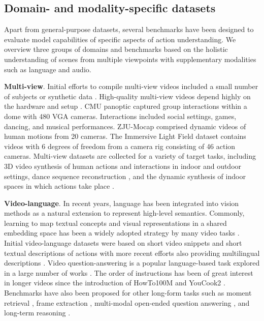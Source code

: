\subsection{Domain- and modality-specific datasets}
\label{sec:datasets::specific}

Apart from general-purpose datasets, several benchmarks have been designed to evaluate model capabilities of specific aspects of action understanding. We overview three groups of domains and benchmarks based on the holistic understanding of scenes from multiple viewpoints with supplementary modalities such as language and audio.

\noindent
\textbf{Multi-view}. Initial efforts to compile multi-view videos included a small number of subjects \citep{sigal2010humaneva} or synthetic data \citep{ionescu2013human3}. High-quality multi-view videos depend highly on the hardware and setup \citep{wang2023learning}. CMU panoptic \citep{joo2017panoptic} captured group interactions within a dome with 480 VGA cameras. Interactions included social settings, games, dancing, and musical performances. ZJU-Mocap \citep{peng2021neural} comprised dynamic videos of human motions from 20 cameras. The Immersive Light Field dataset \citep{broxton2020immersive} contains videos with 6 degrees of freedom from a camera rig consisting of 46 action cameras. Multi-view datasets are collected for a variety of target tasks, including 3D video synthesis of human actions and interactions in indoor \citep{li2022neural} and outdoor \citep{lin2021deep,yoon2020novel} settings, dance sequence reconstruction \citep{tsuchida2019aist}, and the dynamic synthesis of indoor spaces in which actions take place \citep{tschernezki2024epic}.

\noindent
\textbf{Video-language}. In recent years, language has been integrated into vision methods as a natural extension to represent high-level semantics. Commonly, learning to map textual concepts and visual representations in a shared embedding space has been a widely adopted strategy by many video tasks \citep{amrani2021noise,gabeur2020multi,liu2019use,miech2020end}. Initial video-language datasets \citep{chen2011collecting,xu2016msr} were based on short video snippets and short textual descriptions of actions with more recent efforts also providing multilingual descriptions \citep{wang2019vatex}. Video question-answering is a popular language-based task explored in a large number of works \citep{jang2017tgif,lei2018tvqa,li2024mvbench,oncescu2021queryd,rawal2024cinepile,xiao2021next}. The order of instructions has been of great interest in longer videos since the introduction of HowTo100M \citep{miech2019howto100m} and YouCook2 \citep{zhou2018towards}. Benchmarks have also been proposed for other long-form tasks such as moment retrieval \citep{rohrbach2015dataset,song2024moviechat,yang2024vidchapters}, frame extraction \citep{li2024llava}, multi-modal open-ended question answering \citep{fu2024video,ying2024mmt}, and long-term reasoning \citep{fei2024video,mangalam2023egoschema}.

